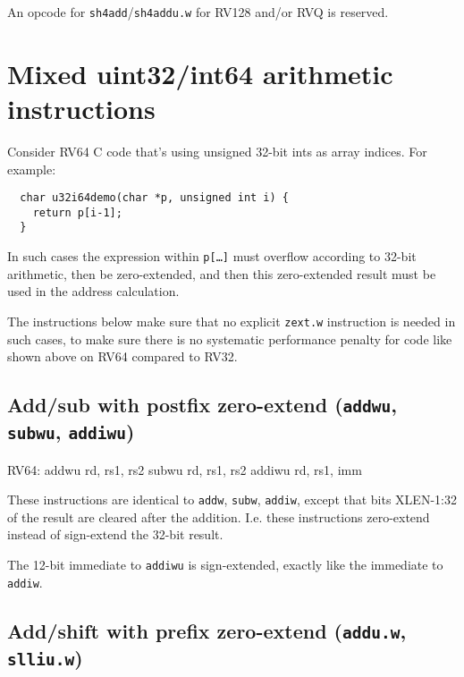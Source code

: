 

An opcode for {\tt sh4add}/{\tt sh4addu.w} for RV128 and/or RVQ is reserved.


\section{Mixed uint32/int64 arithmetic instructions}

Consider RV64 C code that's using unsigned 32-bit ints as array indices. For example:

\begin{minipage}{\linewidth}
\begin{verbatim}
  char u32i64demo(char *p, unsigned int i) {
    return p[i-1];
  }
\end{verbatim}
\end{minipage}

In such cases the expression within {\tt p[\dots]} must overflow according to
32-bit arithmetic, then be zero-extended, and then this zero-extended result
must be used in the address calculation.

The instructions below make sure that no explicit {\tt zext.w} instruction
is needed in such cases, to make sure there is no systematic performance
penalty for code like shown above on RV64 compared to RV32.

\subsection{Add/sub with postfix zero-extend ({\tt addwu}, {\tt subwu}, {\tt addiwu})}

\begin{rvb}
  RV64:
    addwu rd, rs1, rs2
    subwu rd, rs1, rs2
    addiwu rd, rs1, imm
\end{rvb}

These instructions are identical to {\tt addw}, {\tt subw}, {\tt addiw},
except that bits XLEN-1:32 of the result are cleared after the addition. I.e.
these instructions zero-extend instead of sign-extend the 32-bit result.



The 12-bit immediate to {\tt addiwu} is sign-extended, exactly like the immediate
to {\tt addiw}.

\subsection{Add/shift with prefix zero-extend ({\tt addu.w}, {\tt slliu.w})}


